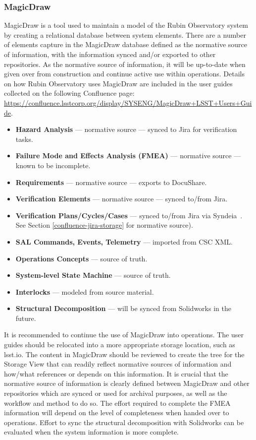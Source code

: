 \subsubsection{MagicDraw}

MagicDraw \citep{MagicDraw-cite} is a tool used to maintain a model of the Rubin Observatory system by creating a relational database between system elements.
There are a number of elements capture in the MagicDraw database defined as the normative source of information, with the information synced and/or exported to other repositories.
As the normative source of information, it will be up-to-date when given over from construction and continue active use within operations.
Details on how Rubin Observatory uses MagicDraw are included in the user guides collected on the following Confluence page: \url{https://confluence.lsstcorp.org/display/SYSENG/MagicDraw+LSST+Users+Guide}.

\begin{itemize}
	\item \textbf{Hazard Analysis} --- normative source --- synced to Jira for verification tasks.
	\item \textbf{Failure Mode and Effects Analysis (FMEA)} --- normative source --- known to be incomplete.
	\item \textbf{Requirements} --- normative source --- exports to DocuShare.
	\item \textbf{Verification Elements} --- normative source --- synced to/from Jira.
	\item \textbf{Verification Plans/Cycles/Cases} --- synced to/from Jira via Syndeia\texttrademark\ \citep{syndeia-cite}.
	See Section \ref{confluence-jira-storage} for normative source).
	\item \textbf{SAL Commands, Events, Telemetry} --- imported from CSC XML.
	\item \textbf{Operations Concepts} --- source of truth.
	\item \textbf{System-level State Machine} --- source of truth.
	\item \textbf{Interlocks} --- modeled from source material.
	\item \textbf{Structural Decomposition} --- will be synced from Solidworks in the future.
\end{itemize}

It is recommended to continue the use of MagicDraw into operations.
The user guides should be relocated into a more appropriate storage location, such as lsst.io.
The content in MagicDraw should be reviewed to create the tree for the Storage View that can readily reflect normative sources of information and how/what references or depends on this information.
It is crucial that the normative source of information is clearly defined between MagicDraw and other repositories which are synced or used for archival purposes, as well as the workflow and method to do so.
The effort required to complete the FMEA information will depend on the level of completeness when handed over to operations.
Effort to sync the structural decomposition with Solidworks can be evaluated when the system information is more complete.

